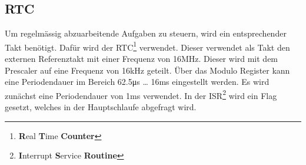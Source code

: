 \subsection{RTC}
\label{sec:rtc}
Um regelmässig abzuarbeitende Aufgaben zu steuern, wird ein entsprechender 
Takt benötigt. Dafür wird der RTC\footnote{\textbf{R}eal \textbf{T}ime 
\textbf{Counter}} verwendet. Dieser verwendet als Takt den externen 
Referenztakt mit einer Frequenz von 16\si{\mega\hertz}. Dieser wird mit dem 
Prescaler auf eine Frequenz von 16\si{\kilo\hertz} geteilt. Über das Modulo 
Register kann eine Periodendauer im Bereich 62.5\si{\micro\second} \ldots 
16\si{\milli\second} eingestellt werden. Es wird zunächst eine Periodendauer 
von 1\si{\milli\second} verwendet. In der ISR\footnote{\textbf{I}nterrupt 
\textbf{S}ervice \textbf{Routine}} wird ein Flag gesetzt, welches in der 
Hauptschlaufe abgefragt wird. 

